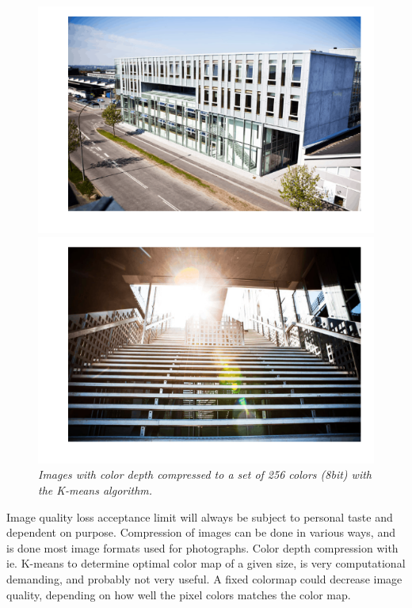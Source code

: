 \documentclass[a4paper,10pt,article,oneside,english]{memoir}
\let\oldcaption\caption
\renewcommand{\caption}[1]{\oldcaption{\emph{#1}}}
\begin{document}
\begin{figure}
	\centering
	\begin{minipage}{.49\textwidth}
		\includegraphics[width=\textwidth]{nygaard_facade_k256.png}
	\end{minipage}
	\hfill
	\begin{minipage}{.49\textwidth}
		\includegraphics[width=\textwidth]{nygaard_stairs_k256.png}
	\end{minipage}
	\caption{Images with color depth compressed to a set of 256 colors (8bit) with the K-means algorithm.}
	\label{fig:comp256}
\end{figure}

Image quality loss acceptance limit will always be subject to personal taste and dependent on purpose. Compression of images can be done in various ways, and is done most image formats used for photographs. Color depth compression with ie. K-means to determine optimal color map of a given size, is very computational demanding, and probably not very useful. A fixed colormap could decrease image quality, depending on how well the pixel colors matches the color map.
\end{document}
